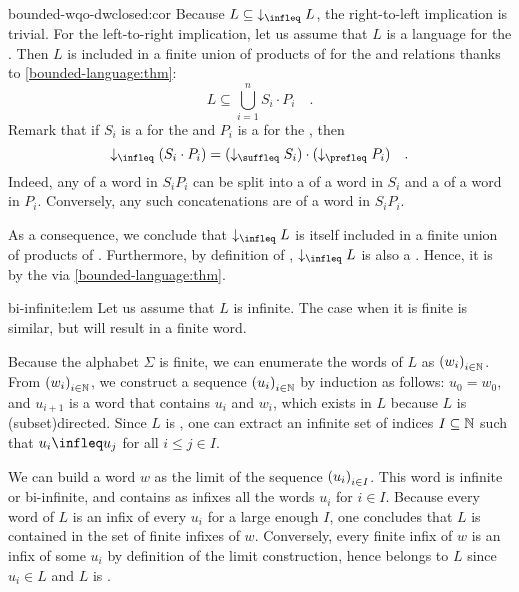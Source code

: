 \begin{proofof}{bounded-wqo-dwclosed:cor}
    Because $L \subseteq \dwset[\infleq]{L}$, the right-to-left implication
    is trivial.
    For the left-to-right implication, let us assume that $L$ is a
     language for the .
    Then $L$ is included in a finite union 
    of products of  for the  and  relations
    thanks to
    \cref{bounded-language:thm}:
    \begin{equation*}
        L \subseteq \bigcup_{i = 1}^n S_i \cdot P_i \quad .
    \end{equation*}
    Remark that if $S_i$ is a  for the 
    and $P_i$ is a  for the ,
    then 
    \begin{equation*}
      \dwset[\infleq]{(S_i \cdot P_i)} = (\dwset[\suffleq]{S_i}) \cdot (\dwset[\prefleq]{P_i})
        \quad .
    \end{equation*}
    Indeed, any  of a word in $S_i P_i$ can be split into
    a  of a word in $S_i$ and a  of a word in $P_i$.
    Conversely, any such concatenations are  of a word in $S_i P_i$.


    As a consequence, we conclude that $\dwset[\infleq]{L}$ is itself included
    in a finite union of products of .
    Furthermore, by definition of ,
    $\dwset[\infleq]{L}$ is also a .
    Hence, it is  by the  
    via
    \cref{bounded-language:thm}.
\end{proofof}



\begin{proofof}{bi-infinite:lem}
    Let us assume that $L$ is infinite. The case when it is finite 
    is similar, but will result in a finite word.

    Because the alphabet $\Sigma$ is finite, we can enumerate the words of $L$
    as $\seqof{w_i}[i \in \Nat]$. From $\seqof{w_i}[i \in \Nat]$, we construct a sequence $\seqof{u_i}[i \in \Nat]$ by induction
    as follows: $u_0 = w_0$, and $u_{i+1}$ is a word that contains $u_i$ and
    $w_i$, which exists in $L$ because $L$ is \kl(subset){directed}. Since $L$ is
    , one can extract an infinite set of indices $I
    \subseteq \mathbb{N}$ such that $u_i \infleq u_{j}$ for all $i \leq j \in I$.

    We can build a word $w$ as the limit of the sequence $\seqof{u_i}[i \in
    I]$. This word is infinite or bi-infinite, and contains as infixes all the
    words $u_i$ for $i \in I$. Because every word of $L$ is an infix of every
    $u_i$ for a large enough $I$, one concludes that $L$ is contained in the
    set of finite infixes of $w$. Conversely, every finite infix of $w$ is 
    an infix of some $u_i$ by definition of the limit construction, hence
    belongs to $L$ since $u_i \in L$ and $L$ is .
\end{proofof}

